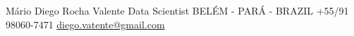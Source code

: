 \documentclass[lighthipster]{simplehipstercv}
\newlength{\rightcolwidth}
\begin{document}
\begin{paracol}{2}
\begin{minipage}[t]{0.3\textwidth}
\vspace{3em}
\end{minipage}






\vfill{} %

\setlength{\parindent}{0pt}
\begin{minipage}[t]{\rightcolwidth}
\begin{center}\fontfamily{\sfdefault}\selectfont \color{black!70}
{\small Mário Diego Rocha Valente  Data Scientist  BELÉM - PARÁ - BRAZIL  \newline {}  +55/91 98060-7471  \protect\url{diego.vatente@gmail.com}
}
\end{center}
\end{minipage}
\end{paracol}
\end{document}

